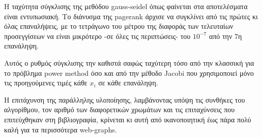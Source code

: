 Η ταχύτητα σύγκλισης της μεθόδου gauss-seidel όπως φαίνεται στα αποτελέσματα είναι εντυπωσιακή. Το διάνυσμα της pagerank άρχισε να συγκλίνει από τις πρώτες κι όλας επαναλήψεις, με το τετράγωνο του μέτρου της διαφοράς των τελευταίων προσεγγίσεων να είναι μικρότερο -σε όλες τις περιπτώσεις- του $10^{-7}$ από την 7η επανάληψη. 

Αυτός ο   ρυθμός σύγκλισης την καθιστά σαφώς ταχύτερη τόσο από την κλασσική για το πρόβλημα power method\parencite{silvestrepagerank} όσο και από την μέθοδο Jacobi που χρησιμοποιεί μόνο τις προηγούμενες τιμές κάθε $x_i$ σε κάθε επανάληψη.

Η επιτάχυνση της παράλληλης υλοποίησης, λαμβάνοντας υπόψη τις συνθήκες του αλγορίθμου, τον αριθμό των διαφορετικών χρωμάτων και τις επιταχύνσεις που επιτεύχθηκαν στη βιβλιογραφία\parencite{hasenplaugh2016parallel}, κρίνεται κι αυτή από ικανοποιητική έως πάρα πολύ καλή για τα περισσότερα web-graphs.
